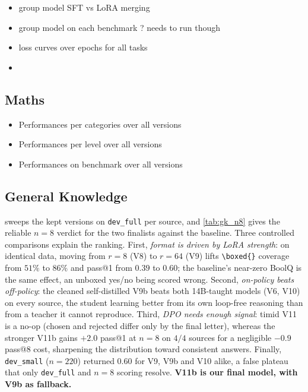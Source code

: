 \documentclass[11pt]{article}
\begin{document}
\begin{itemize}
    \item group model SFT vs LoRA merging
    \item group model on each benchmark ? needs to run though
    \item loss curves over epochs for all tasks
    \item 
\end{itemize}

\subsection{Maths}

\begin{itemize}
    \item Performances per categories over all versions
    \item Performances per level over all versions
    \item Performances on benchmark over all versions
\end{itemize}

\subsection{General Knowledge}

 sweeps the kept versions on \texttt{dev\_full} per source, and \cref{tab:gk_n8} gives the reliable $n{=}8$ verdict for the two finalists against the baseline. Three controlled comparisons explain the ranking. First, \emph{format is driven by LoRA strength}: on identical data, moving from $r{=}8$ (V8) to $r{=}64$ (V9) lifts \texttt{\textbackslash boxed\{\}} coverage from $51\%$ to $86\%$ and pass@1 from $0.39$ to $0.60$; the baseline's near-zero BoolQ is the same effect, an unboxed yes/no being scored wrong. Second, \emph{on-policy beats off-policy}: the cleaned self-distilled V9b beats both 14B-taught models (V6, V10) on every source, the student learning better from its own loop-free reasoning than from a teacher it cannot reproduce. Third, \emph{DPO needs enough signal}: timid V11 is a no-op (chosen and rejected differ only by the final letter), whereas the stronger V11b gains $+2.0$ pass@1 at $n{=}8$ on $4/4$ sources for a negligible $-0.9$ pass@8 cost, sharpening the distribution toward consistent answers. Finally, \texttt{dev\_small} ($n{=}220$) returned $0.60$ for V9, V9b and V10 alike, a false plateau that only \texttt{dev\_full} and $n{=}8$ scoring resolve. \textbf{V11b is our final model, with V9b as fallback.}
\end{document}

